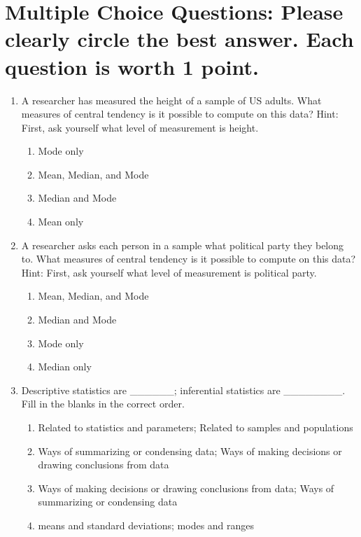 \documentclass{article}
\begin{document}
\section*{Multiple Choice Questions: Please clearly circle the best answer. Each question is worth 1 point.}

\begin{enumerate}[label=\textbf{Q\arabic*:}]
    \item A researcher has measured the height of a sample of US adults. What measures of central tendency is it possible to compute on this data? Hint: First, ask yourself what level of measurement is height.
    \begin{enumerate}[label=\alph*)]
        \item Mode only
        \item Mean, Median, and Mode
        \item Median and Mode
        \item Mean only
    \end{enumerate}

    \item A researcher asks each person in a sample what political party they belong to. What measures of central tendency is it possible to compute on this data? Hint: First, ask yourself what level of measurement is political party.
    \begin{enumerate}[label=\alph*)]
        \item Mean, Median, and Mode
        \item Median and Mode
        \item Mode only
        \item Median only
    \end{enumerate}

    \item Descriptive statistics are \_\_\_\_\_\_; inferential statistics are \_\_\_\_\_\_\_\_. Fill in the blanks in the correct order.
    \begin{enumerate}[label=\alph*)]
        \item Related to statistics and parameters; Related to samples and populations
        \item Ways of summarizing or condensing data; Ways of making decisions or drawing conclusions from data
        \item Ways of making decisions or drawing conclusions from data; Ways of summarizing or condensing data
        \item means and standard deviations; modes and ranges
    \end{enumerate}


\end{enumerate}
\end{document}
